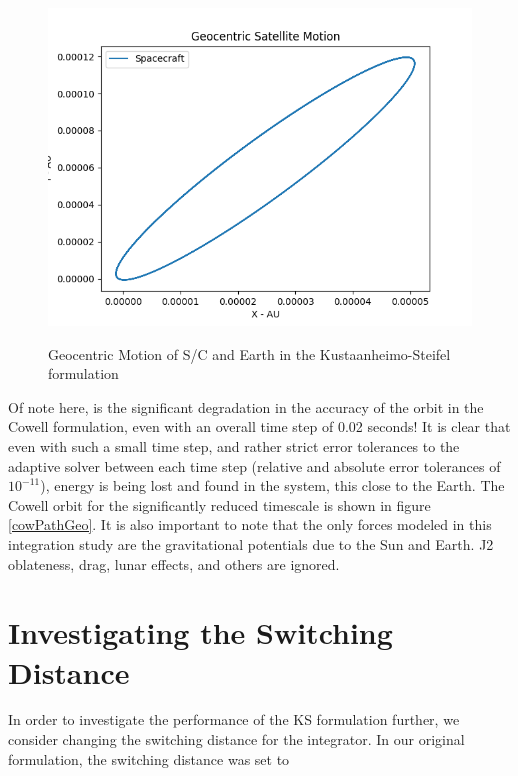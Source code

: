 \documentclass[11pt,twoside,letterpaper]{article}
\begin{document}
  \begin{figure}
    \caption{Geocentric Motion of S/C and Earth in the Kustaanheimo-Steifel formulation}
    \centering
    \includegraphics[scale=0.5]{PlanarPathKSGeo}
    \label{kspathGeo}
  \end{figure}

  Of note here, is the significant degradation in the accuracy of the
  orbit in the Cowell formulation, even with an overall time step of
  0.02 seconds! It is clear that even with such a small time step, and
  rather strict error tolerances to the adaptive solver between each
  time step (relative and absolute error tolerances of
  \( 10^{-11} \)), energy is being lost and found in the system, this
  close to the Earth. The Cowell orbit for the significantly reduced
  timescale is shown in figure \ref{cowPathGeo}. It is also important
  to note that the only forces modeled in this integration study are
  the gravitational potentials due to the Sun and Earth. J2
  oblateness, drag, lunar effects, and others are ignored. 
  
  
  \section{Investigating the Switching Distance}
  In order to investigate the performance of the KS formulation
  further, we consider changing the switching distance for the
  integrator. In our original formulation, the switching distance was
  set to
  
\end{document}
